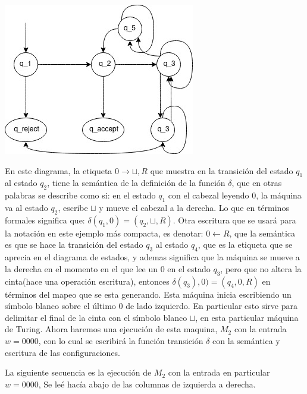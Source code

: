 \documentclass[10pt]{report}
\begin{document}
    \begin{center}
        \includegraphics{Untitled Diagram.jpg}
    \end{center}
    \newline
    En este diagrama, la etiqueta $0\rightarrow \sqcup,R$ que muestra en la transición del estado $q_{1}$ al estado $q_{2}$,
    tiene la semántica de la definición de la función $\delta$, que en otras palabras se describe como si:\newline
    en el estado $q_{1}$ con el cabezal leyendo $0$, la máquina va al estado $q_{2}$, escribe $\sqcup$ y mueve el cabezal
    a la derecha.\newline
    Lo que en términos formales significa que: $\delta(q_{1},0) = (q_{2},\sqcup, R)$.
    Otra escritura que se usará para la notación en este ejemplo más compacta,
    es denotar: $0\leftarrow R$, que la semántica es que se hace la transición del estado $q_{3}$ al estado $q_{4}$, que
    es la etiqueta que se aprecia en el diagrama de estados, y ademas significa que la máquina se mueve a la derecha en
    el momento en el que lee un $0$ en el estado $q_{3}$, pero que no altera la cinta(\no hace una operación escritura),
    entonces $\delta(q_{3}),0) = (q_{4},0,R)$ en términos del mapeo que se esta generando.\newline
    Esta máquina inicia escribiendo un símbolo blanco sobre el último $0$ de lado izquierdo. En particular esto sirve
    para delimitar el final de la cinta con el símbolo blanco $\sqcup$, en esta particular máquina de Turing.
    \newline
    Ahora haremos una ejecución de esta maquina, $M_{2}$ con la entrada $w = 0000$, con lo cual se escribirá la función
    transición $\delta$ con la semántica y escritura de las configuraciones.

    La siguiente secuencia es la ejecución de $M_{2}$ con la entrada en particular $w = 0000$,
    Se leé hacía abajo de las columnas de izquierda a derecha.
\end{document}
